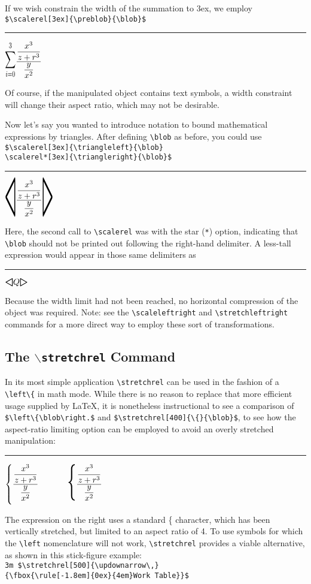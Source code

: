 \documentclass{article}
\newcommand\rl{\rule{2em}{0in}}
\let\vb\verb
\begin{document}
If we wish constrain the width of the summation to 3ex, we employ\\
\vb|$\scalerel[3ex]{\preblob}{\blob}$|

    \rl$\scalerel[3ex]{\preblob}{\blob}$

Of course, if the manipulated object contains text symbols, a width
constraint will change their aspect ratio, which may not be desirable.

Now let's say you wanted to introduce notation to bound mathematical
expressions by triangles. After defining
\vb|\blob| as before, you could use\\
\vb|$\scalerel[3ex]{\triangleleft}{\blob}|\\
\vb|\scalerel*[3ex]{\triangleright}{\blob}$|

\rl%
$\scalerel[3ex]{\triangleleft}{\blob}\scalerel*[3ex]{\triangleright}{\blob}$

Here, the second call to \vb|\scalerel| was with the star (\vb|*|)
option, indicating that \vb|\blob| should not be printed out following
the right-hand delimiter.  A less-tall expression would appear in those
same delimiters as

\rl%
$\scalerel[3ex]{\triangleleft}{Q}\scalerel*[3ex]{\triangleright}{Q}$

Because the width limit had not been reached, no horizontal compression
of the object was required.  Note: see the \vb|\scaleleftright| and
\vb|\stretchleftright| commands for a more direct way to employ these
sort of transformations.

\subsection{The $\backslash$\texttt{stretchrel} Command}

In its most simple application \vb|\stretchrel| can be used in the
fashion of a \vb|\left\{| in math mode.  While there is no reason to
replace that more efficient usage supplied by \LaTeX{}, it is
nonetheless instructional to see a comparison of 
\vb|$\left\{\blob\right.$| and \vb|$\stretchrel[400]{\{}{\blob}$|, to
see how the aspect-ratio limiting option can be employed to avoid an
overly stretched manipulation:

\rl$\left\{\blob\right.$  ~~~~~ $\stretchrel[400]{\{}{\blob}$

The expression on the right uses a standard \{ character, which has been
vertically stretched, but limited to an aspect ratio of 4.  To use
symbols for which the \vb|\left| nomenclature will not work,
\vb|\stretchrel| provides a viable alternative, as shown in this
stick-figure example:\\
\vb|3m $\stretchrel[500]{\updownarrow\,}|\\
\vb|{\fbox{\rule[-1.8em]{0ex}{4em}Work Table}}$|
\end{document}

